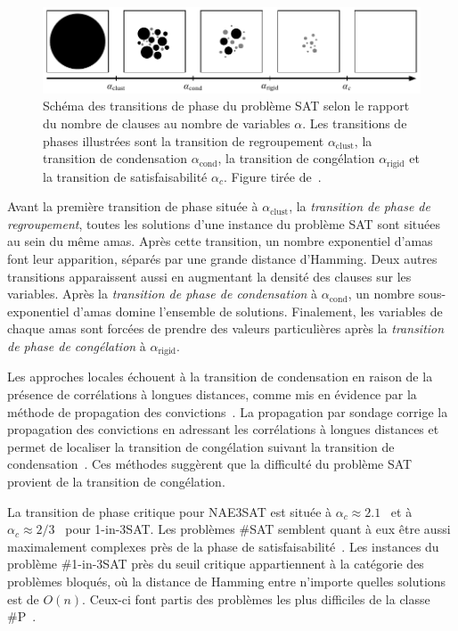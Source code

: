 \begin{figure}[H]
    \centering
    \includegraphics[width=1\textwidth]{figures/phase-transitions.pdf}
    \caption[Transitions de phase du problème SAT]{Schéma des transitions de phase du problème SAT selon le rapport du nombre de clauses au nombre de variables $\alpha$. Les transitions de phases illustrées sont la transition de regroupement $\alpha_{\text{clust}}$, la transition de condensation $\alpha_{\text{cond}}$, la transition de congélation $\alpha_{\text{rigid}}$ et la transition de satisfaisabilité $\alpha_{c}$. Figure tirée de~\cite{mooreNatureComputation2011}.}
    \label{fig:transitions-de-phase}
\end{figure}

Avant la première transition de phase située à $\alpha_{\text{clust}}$, la \textit{transition de phase de regroupement}, toutes les solutions d'une instance du problème SAT sont situées au sein du même amas. Après cette transition, un nombre exponentiel d'amas font leur apparition, séparés par une grande distance d'Hamming. Deux autres transitions apparaissent aussi en augmentant la densité des clauses sur les variables. Après la \textit{transition de phase de condensation} à $\alpha_{\text{cond}}$, un nombre sous-exponentiel d'amas domine l'ensemble de solutions. Finalement, les variables de chaque amas sont forcées de prendre des valeurs particulières après la \textit{transition de phase de congélation} à $\alpha_{\text{rigid}}$.

Les approches locales échouent à la transition de condensation en raison de la présence de corrélations à longues distances, comme mis en évidence par la méthode de propagation des convictions~\cite{mezardInformationPhysicsComputation2009}. La propagation par sondage corrige la propagation des convictions en adressant les corrélations à longues distances et permet de localiser la transition de congélation suivant la transition de condensation~\cite{mezardInformationPhysicsComputation2009}. Ces méthodes suggèrent que la difficulté du problème SAT provient de la transition de congélation. 

La transition de phase critique pour NAE3SAT est située à $\alpha_{c} \approx 2.1$~\cite{achlioptasPhaseTransition1ink2001} et à $\alpha_{c} \approx 2/3$~\cite{raymondPhaseDiagram1in32007} pour 1-in-3SAT. Les problèmes \#SAT semblent quant à eux être aussi maximalement complexes près de la phase de satisfaisabilité~\cite{dyerMarkovChainsIndependent2000, barthelClusteringAnalysisGroundstate2004}. Les instances du problème \#1-in-3SAT près du seuil critique appartiennent à la catégorie des problèmes bloqués, où la distance de Hamming entre n'importe quelles solutions est de $O(n)$. Ceux-ci font partis des problèmes les plus difficiles de la classe \textsf{\#P}~\cite{zdeborovaStatisticalPhysicsHard2008}.

